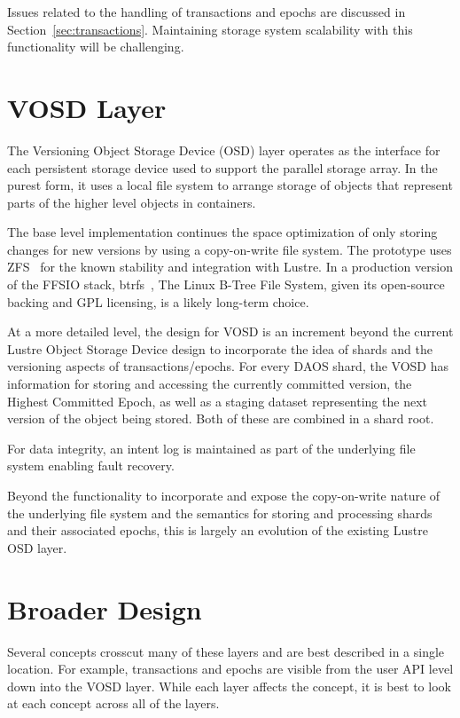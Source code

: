 \documentclass[conference]{IEEEtran} \pdfpagewidth=8.5in
\begin{document}
Issues related to the handling of transactions and epochs are discussed in
Section~\ref{sec:transactions}. Maintaining storage system scalability with
this functionality will be challenging.

\section{VOSD Layer}
\label{sec:vosd}

The Versioning Object Storage Device (OSD) layer operates as the interface for
each persistent storage device used to support the parallel storage array. In
the purest form, it uses a local file system to arrange storage of objects that
represent parts of the higher level objects in containers.

The base level implementation continues the space optimization of only storing
changes for new versions by using a copy-on-write file system. The prototype
uses ZFS~\cite{zhang:2010:zfs} for the known stability and integration with
Lustre. In a production version of the FFSIO stack,
btrfs~\cite{rodeh:2013:btrfs}, The Linux B-Tree File System, given its
open-source backing and GPL licensing, is a likely long-term choice.

At a more detailed level, the design for VOSD is an increment beyond the
current Lustre Object Storage Device design to incorporate the idea of shards
and the versioning aspects of transactions/epochs. For every DAOS shard, the
VOSD has information for storing and accessing the currently committed version,
the Highest Committed Epoch, as well as a staging dataset representing the
next version of the object being stored. Both of these are combined in a shard
root.

For data integrity, an intent log is maintained as part of the underlying file
system enabling fault recovery.

Beyond the functionality to incorporate and expose the copy-on-write nature
of the underlying file system and the semantics for storing and processing
shards and their associated epochs, this is largely an evolution of the
existing Lustre OSD layer.

\section{Broader Design}
\label{sec:broader}

Several concepts crosscut many of these layers and are best described in a
single location. For example, transactions and epochs are visible from the
user API level down into the VOSD layer. While each layer affects the concept,
it is best to look at each concept across all of the layers.
\end{document}
